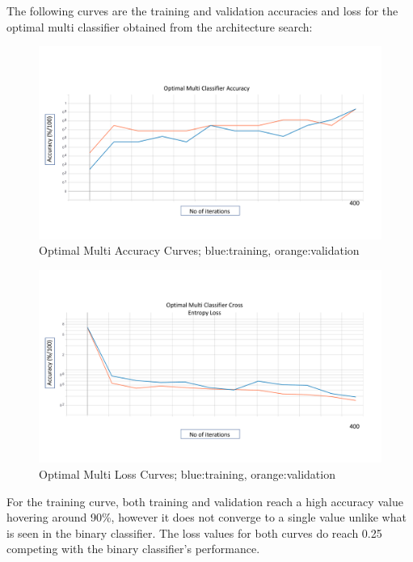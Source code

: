 \documentclass[a4paper]{article}
\begin{document}
        The following curves are the training and validation accuracies and loss for the optimal multi classifier obtained from the architecture search:
        \begin{figure}[h!]
            \centerline{\includegraphics[width=1\textwidth]{../img/results/multiAcc.pdf}}
            \label{figX: Optimal Multi Accuracy Curves} 
            \caption{Optimal Multi Accuracy Curves; blue:training, orange:validation}
        \end{figure}
        \begin{figure}[h!]
            \centerline{\includegraphics[width=1\textwidth]{../img/results/multiLoss.pdf}}
            \label{figX: Optimal Multi Loss Curves} 
            \caption{Optimal Multi Loss Curves; blue:training, orange:validation}
        \end{figure}
        
        For the training curve, both training and validation reach a high accuracy value hovering around 90\%, however it does not converge to a single value unlike what is seen in the binary classifier. The loss values for both curves do reach 0.25 competing with the binary classifier's performance. 
        
\end{document}
